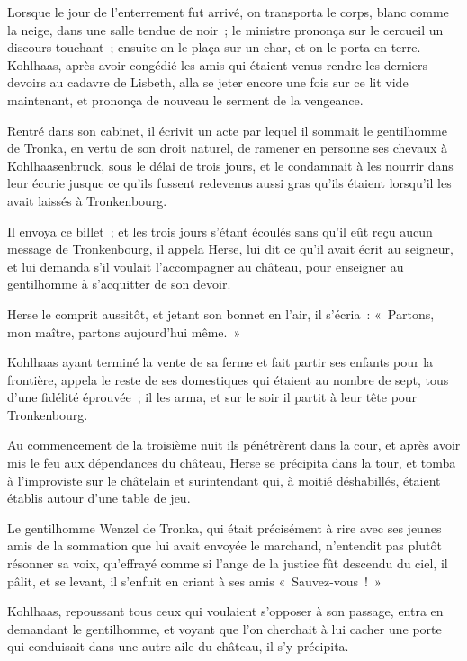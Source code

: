 \documentclass[french,twoside]{book} %
\begin{document}
Lorsque le jour de l’enterrement fut arrivé, on transporta le corps, blanc comme la neige, dans une salle tendue de noir ; le ministre prononça sur le cercueil un discours touchant ; ensuite on le plaça sur un char, et on le porta en terre. Kohlhaas, après avoir congédié les amis qui étaient venus rendre les derniers devoirs au cadavre de Lisbeth, alla se jeter encore une fois sur ce lit vide maintenant, et prononça de nouveau le serment de la vengeance.\par
Rentré dans son cabinet, il écrivit un acte par lequel il sommait le gentilhomme de Tronka, en vertu de son droit naturel, de ramener en personne ses chevaux à Kohlhaasenbruck, sous le délai de trois jours, et le condamnait à les nourrir dans leur écurie jusque ce qu’ils fussent redevenus aussi gras qu’ils étaient lorsqu’il les avait laissés à Tronkenbourg.\par
Il envoya ce billet ; et les trois jours s’étant écoulés sans qu’il eût reçu aucun message de Tronkenbourg, il appela Herse, lui dit ce qu’il avait écrit au seigneur, et lui demanda s’il voulait l’accompagner au château, pour enseigner au gentilhomme à s’acquitter de son devoir.\par
Herse le comprit aussitôt, et jetant son bonnet en l’air, il s’écria : « Partons, mon maître, partons aujourd’hui même. »\par
Kohlhaas ayant terminé la vente de sa ferme et fait partir ses enfants pour la frontière, appela le reste de ses domestiques qui étaient au nombre de sept, tous d’une fidélité éprouvée ; il les arma, et sur le soir il partit à leur tête pour Tronkenbourg.\par
Au commencement de la troisième nuit ils pénétrèrent dans la cour, et après avoir mis le feu aux dépendances du château, Herse se précipita dans la tour, et tomba à l’improviste sur le châtelain et surintendant qui, à moitié déshabillés, étaient établis autour d’une table de jeu.\par
Le gentilhomme Wenzel de Tronka, qui était précisément à rire avec ses jeunes amis de la sommation que lui avait envoyée le marchand, n’entendit pas plutôt résonner sa voix, qu’effrayé comme si l’ange de la justice fût descendu du ciel, il pâlit, et se levant, il s’enfuit en criant à ses amis « Sauvez-vous ! »\par
Kohlhaas, repoussant tous ceux qui voulaient s’opposer à son passage, entra en demandant le gentilhomme, et voyant que l’on cherchait à lui cacher une porte qui conduisait dans une autre aile du château, il s’y précipita.\par
\end{document}
